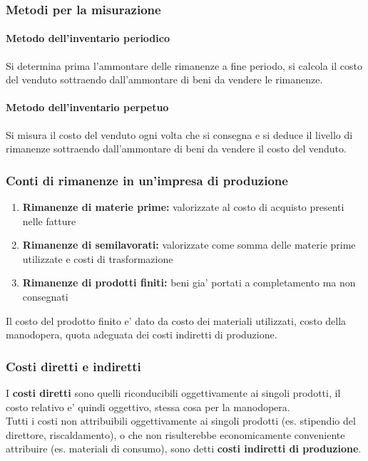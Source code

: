 \documentclass{report}
\begin{document}
	\subsubsection{Metodi per la misurazione}
	\paragraph{Metodo dell'inventario periodico} Si determina prima l'ammontare delle rimanenze a fine periodo, si calcola il costo del venduto sottraendo dall'ammontare di beni da vendere le rimanenze.
	\paragraph{Metodo dell'inventario perpetuo} Si misura il costo del venduto ogni volta che si consegna e si deduce il livello di rimanenze sottraendo dall'ammontare di beni da vendere il costo del venduto.
	\subsubsection{Conti di rimanenze in un'impresa di produzione}
	\begin{enumerate}
		\item \textbf{Rimanenze di materie prime:} valorizzate al costo di acquisto presenti nelle fatture
		\item \textbf{Rimanenze di semilavorati:} valorizzate come somma delle materie prime utilizzate e costi di trasformazione
		\item \textbf{Rimanenze di prodotti finiti:} beni gia' portati a completamento ma non consegnati
	\end{enumerate}
	Il costo del prodotto finito e' dato da costo dei materiali utilizzati, costo della manodopera, quota adeguata dei costi indiretti di produzione.
	\subsubsection{Costi diretti e indiretti}
	I \textbf{costi diretti} sono quelli riconducibili oggettivamente ai singoli prodotti, il costo relativo e' quindi oggettivo, stessa cosa per la manodopera.
	\medskip \\
	Tutti i costi non attribuibili oggettivamente ai singoli prodotti (es. stipendio del direttore, riscaldamento), o che non risulterebbe economicamente conveniente attribuire (es. materiali di consumo), sono detti \textbf{costi indiretti di produzione}.
\end{document}
